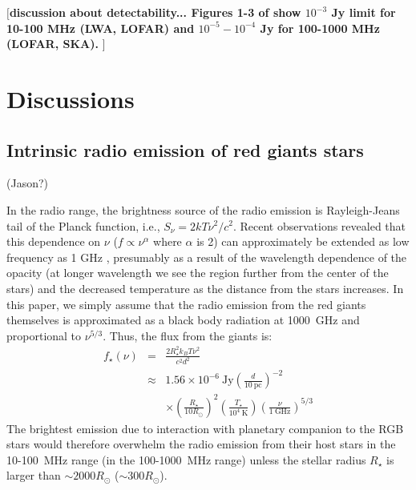 \documentclass{emulateapj}
\def\memoYF#1{\color{red}$[${\bf #1}$]$ \color{black}}
\begin{document}
\memoYF{discussion about detectability... Figures 1-3 of \citet{griesmeier2007b} show $10^{-3}$ Jy limit for 10-100 MHz (LWA, LOFAR) and $10^{-5}-10^{-4}$ Jy for 100-1000 MHz (LOFAR, SKA). }


\newpage

\section{Discussions}
\label{s:discussion}

\subsection{Intrinsic radio emission of red giants stars}
\label{ss:RGradio}

(Jason?)

In the radio range, the brightness source of the radio emission is Rayleigh-Jeans tail of the Planck function, i.e., $S_{\nu } = 2kT\nu^2/c^2$. Recent observations revealed that this dependence on $\nu$ ($f \propto \nu^{\alpha }$ where $\alpha $ is 2) can approximately be extended as low frequency as 1 GHz \citep{gorman2013}, presumably as a result of the wavelength dependence of the opacity (at longer wavelength we see the region further from the center of the stars) and the decreased temperature as the distance from the stars increases. 
In this paper, we simply assume that the radio emission from the red giants themselves is approximated as a black body radiation at 1000~GHz and proportional to $\nu ^{5/3}$. 
Thus, the flux from the giants is:
\begin{eqnarray}
f_{\star } (\nu ) &=& \frac{2R_{\star }^2 k_B T \nu^2}{c^2 d^2}  \\
&\approx & 1.56 \times 10^{-6} ~\mbox{Jy} \left( \frac{d}{10 ~\mbox{pc}} \right)^{-2} \\
&& \times \left( \frac{R_{\star }}{10 R_{\odot }} \right)^2 \left( \frac{T_{\star }}{10^{4}~\mbox{K}} \right) \left( \frac{\nu}{1~\mbox{GHz}} \right)^{5/3} 
\end{eqnarray}
The brightest emission due to interaction with planetary companion to the RGB stars would therefore overwhelm the radio emission from their host stars in the 10-100~MHz range (in the 100-1000~MHz range) unless the stellar radius $R_{\star }$ is larger than $\sim 2000R_{\odot }$ ($\sim 300R_{\odot }$). 
\end{document}
